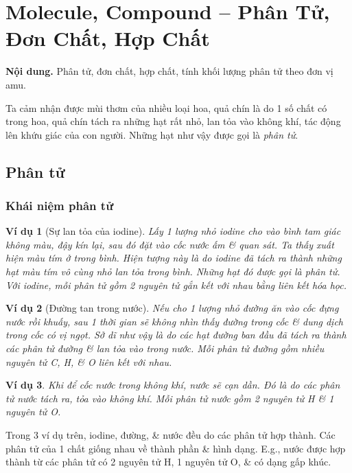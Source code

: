 \documentclass{article}
\newtheorem{vidu}{Ví dụ}
\begin{document}

\section{Molecule, Compound -- Phân Tử, Đơn Chất, Hợp Chất}
\textsf{\textbf{Nội dung.} Phân tử, đơn chất, hợp chất, tính khối lượng phân tử theo đơn vị amu.}

Ta cảm nhận được mùi thơm của nhiều loại hoa, quả chín là do 1 số chất có trong hoa, quả chín tách ra những hạt rất nhỏ, lan tỏa vào không khí, tác động lên khứu giác của con người. Những hạt như vậy được gọi là \textit{phân tử}.

\subsection{Phân tử}

\subsubsection{Khái niệm phân tử}

\begin{vidu}[Sự lan tỏa của iodine]
	Lấy 1 lượng nhỏ iodine cho vào bình tam giác không màu, đậy kín lại, sau đó đặt vào cốc nước ấm \& quan sát. Ta thấy xuất hiện màu tím ở trong bình. Hiện tượng này là do iodine đã tách ra thành những hạt màu tím vô cùng nhỏ lan tỏa trong bình. Những hạt đó được gọi là phân tử. Với iodine, mỗi phân tử gồm 2 nguyên tử gắn kết với nhau bằng liên kết hóa học.
\end{vidu}

\begin{vidu}[Đường tan trong nước]
	Nếu cho 1 lượng nhỏ đường ăn \emph{} vào cốc đựng nước rồi khuấy, sau 1 thời gian sẽ không nhìn thấy đường trong cốc \& dung dịch trong cốc có vị ngọt. Sở dĩ như vậy là do các hạt đường ban đầu đã tách ra thành các phân tử đường \& lan tỏa vào trong nước. Mỗi phân tử đường gồm nhiều nguyên tử \emph{C, H}, \& \emph{O} liên kết với nhau.
\end{vidu}

\begin{vidu}
	Khi để cốc nước \emph{} trong không khí, nước sẽ cạn dần. Đó là do các phân tử nước tách ra, tỏa vào không khí. Mỗi phân tử nước gồm 2 nguyên tử \emph{H} \& 1 nguyên tử \emph{O}.
\end{vidu}
Trong 3 ví dụ trên, iodine, đường, \& nước đều do các phân tử hợp thành. Các phân tử của 1 chất giống nhau về thành phần \& hình dạng. E.g., nước được hợp thành từ các phân tử có 2 nguyên tử H, 1 nguyên tử O, \& có dạng gấp khúc.
\end{document}
